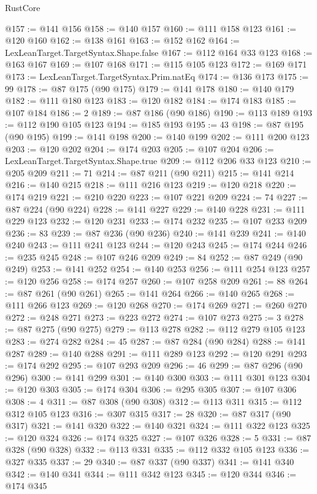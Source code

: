 \begin{lexlean}{RustCore}
\begin{coremodule}
@157 := @141 @156
@158 := @140 @157
@160 := @111 @158 @123
@161 := @120 @160
@162 := @138 @161
@163 := @152 @162
@164 := LexLeanTarget.TargetSyntax.Shape.false
@167 := @112 @164 @33 @123
@168 := @163 @167
@169 := @107 @168
@171 := @115 @105 @123
@172 := @169 @171
@173 := LexLeanTarget.TargetSyntax.Prim.natEq
@174 := @136 @173
@175 := 99
@178 := @87 @175 (@90 @175)
@179 := @141 @178
@180 := @140 @179
@182 := @111 @180 @123
@183 := @120 @182
@184 := @174 @183
@185 := @107 @184
@186 := 2
@189 := @87 @186 (@90 @186)
@190 := @113 @189
@193 := @112 @190 @105 @123
@194 := @185 @193
@195 := 43
@198 := @87 @195 (@90 @195)
@199 := @141 @198
@200 := @140 @199
@202 := @111 @200 @123
@203 := @120 @202
@204 := @174 @203
@205 := @107 @204
@206 := LexLeanTarget.TargetSyntax.Shape.true
@209 := @112 @206 @33 @123
@210 := @205 @209
@211 := 71
@214 := @87 @211 (@90 @211)
@215 := @141 @214
@216 := @140 @215
@218 := @111 @216 @123
@219 := @120 @218
@220 := @174 @219
@221 := @210 @220
@223 := @107 @221 @209
@224 := 74
@227 := @87 @224 (@90 @224)
@228 := @141 @227
@229 := @140 @228
@231 := @111 @229 @123
@232 := @120 @231
@233 := @174 @232
@235 := @107 @233 @209
@236 := 83
@239 := @87 @236 (@90 @236)
@240 := @141 @239
@241 := @140 @240
@243 := @111 @241 @123
@244 := @120 @243
@245 := @174 @244
@246 := @235 @245
@248 := @107 @246 @209
@249 := 84
@252 := @87 @249 (@90 @249)
@253 := @141 @252
@254 := @140 @253
@256 := @111 @254 @123
@257 := @120 @256
@258 := @174 @257
@260 := @107 @258 @209
@261 := 88
@264 := @87 @261 (@90 @261)
@265 := @141 @264
@266 := @140 @265
@268 := @111 @266 @123
@269 := @120 @268
@270 := @174 @269
@271 := @260 @270
@272 := @248 @271
@273 := @223 @272
@274 := @107 @273
@275 := 3
@278 := @87 @275 (@90 @275)
@279 := @113 @278
@282 := @112 @279 @105 @123
@283 := @274 @282
@284 := 45
@287 := @87 @284 (@90 @284)
@288 := @141 @287
@289 := @140 @288
@291 := @111 @289 @123
@292 := @120 @291
@293 := @174 @292
@295 := @107 @293 @209
@296 := 46
@299 := @87 @296 (@90 @296)
@300 := @141 @299
@301 := @140 @300
@303 := @111 @301 @123
@304 := @120 @303
@305 := @174 @304
@306 := @295 @305
@307 := @107 @306
@308 := 4
@311 := @87 @308 (@90 @308)
@312 := @113 @311
@315 := @112 @312 @105 @123
@316 := @307 @315
@317 := 28
@320 := @87 @317 (@90 @317)
@321 := @141 @320
@322 := @140 @321
@324 := @111 @322 @123
@325 := @120 @324
@326 := @174 @325
@327 := @107 @326
@328 := 5
@331 := @87 @328 (@90 @328)
@332 := @113 @331
@335 := @112 @332 @105 @123
@336 := @327 @335
@337 := 29
@340 := @87 @337 (@90 @337)
@341 := @141 @340
@342 := @140 @341
@344 := @111 @342 @123
@345 := @120 @344
@346 := @174 @345

\end{coremodule}
\end{lexlean}

